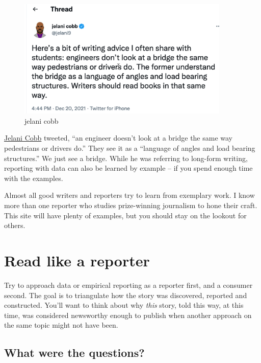 \documentclass[
  letterpaper,
  DIV=11,
  numbers=noendperiod]{scrreprt}
\begin{document}
\begin{figure}

{\centering \includegraphics[width=0.9\textwidth,height=\textheight]{./images/start-story-cobb.png}

}

\caption{jelani cobb}

\end{figure}

\href{https://twitter.com/jelani9/status/1473046796205117443}{Jelani
Cobb} tweeted, ``an engineer doesn't look at a bridge the same way
pedestrians or drivers do.'' They see it as a ``language of angles and
load bearing structures.'' We just see a bridge. While he was referring
to long-form writing, reporting with data can also be learned by example
-- if you spend enough time with the examples.

Almost all good writers and reporters try to learn from exemplary work.
I know more than one reporter who studies prize-winning journalism to
hone their craft. This site will have plenty of examples, but you should
stay on the lookout for others.

\hypertarget{read-like-a-reporter}{%
\section{Read like a reporter}\label{read-like-a-reporter}}

Try to approach data or empirical reporting as a reporter first, and a
consumer second. The goal is to triangulate how the story was
discovered, reported and constructed. You'll want to think about why
\emph{this} story, told this way, at this time, was considered
newsworthy enough to publish when another approach on the same topic
might not have been.

\hypertarget{what-were-the-questions}{%
\subsection*{What were the questions?}\label{what-were-the-questions}}
\end{document}
